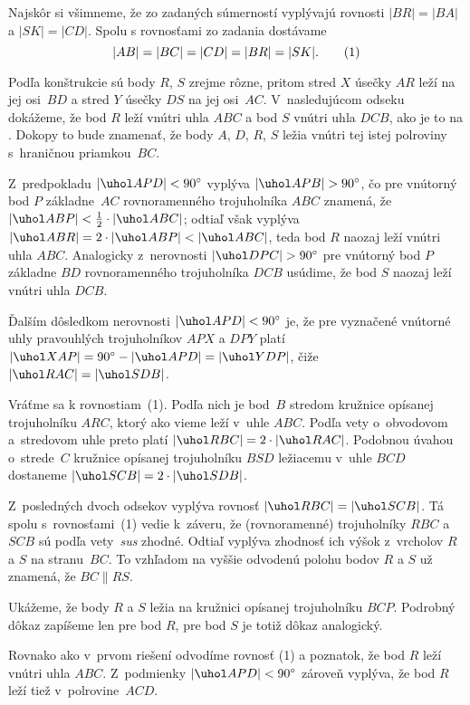 {%
Najskôr si všimneme, že zo zadaných súmerností vyplývajú
rovnosti $|BR| = |BA|$ a $|SK| = |CD|$. Spolu s rovnosťami
zo zadania dostávame
$$
|AB|=|BC|=|CD|=|BR|=|SK|.
\tag1
$$

Podľa konštrukcie sú body $R$, $S$ zrejme rôzne, pritom stred $X$
úsečky $AR$ leží na jej osi~$BD$ a stred $Y$ úsečky $DS$ na jej
osi~$AC$. V~nasledujúcom odseku dokážeme, že bod $R$ leží vnútri
uhla $ABC$ a bod $S$ vnútri uhla $DCB$, ako je to na \obr{}.
Dokopy to bude znamenať, že body $A$, $D$, $R$, $S$ ležia
vnútri tej istej polroviny s~hraničnou priamkou~$BC$.
%

Z~predpokladu $|\uhol APD|<90^{\circ}$ vyplýva $|\uhol APB|>90^{\circ}$,
čo pre vnútorný bod $P$ základne~$AC$ rovnoramenného trojuholníka $ABC$
znamená, že $|\uhol ABP|<\frac12\cdot|\uhol ABC|$; odtiaľ však vyplýva
$|\uhol ABR|=2\cdot|\uhol ABP|<|\uhol ABC|$, teda bod $R$
naozaj leží vnútri uhla $ABC$. Analogicky z~nerovnosti
$|\uhol DPC|>90^{\circ}$ pre vnútorný bod $P$ základne $BD$
rovnoramenného trojuholníka $DCB$ usúdime, že bod $S$ naozaj leží
vnútri uhla $DCB$.

Ďalším dôsledkom nerovnosti $|\uhol APD|<90^{\circ}$ je, že pre
vyznačené vnútorné uhly pravouhlých trojuholníkov $APX$ a $DPY$ platí
$|\uhol XAP|=90^{\circ}-|\uhol APD|=|\uhol YDP|$, čiže
$|\uhol RAC|=|\uhol SDB|$.

Vráťme sa k rovnostiam~(1). Podľa nich je bod~$B$ stredom
kružnice opísanej trojuholníku $ARC$, ktorý ako vieme leží v~uhle $ABC$.
Podľa vety o~obvodovom a~stredovom uhle preto platí
$|\uhol RBC|=2\cdot|\uhol RAC|$. Podobnou úvahou o~strede~$C$
kružnice opísanej trojuholníku $BSD$ ležiacemu v~uhle $BCD$ dostaneme
$|\uhol SCB|=2\cdot|\uhol SDB|$.

Z~posledných dvoch odsekov vyplýva rovnosť $|\uhol RBC|=|\uhol SCB|$.
Tá spolu s~rovnosťami~(1) vedie k~záveru, že (rovnoramenné) trojuholníky
$RBC$ a $SCB$ sú podľa vety~\emph{sus} zhodné. Odtiaľ vyplýva zhodnosť
ich výšok z~vrcholov $R$ a $S$ na stranu~$BC$.
To vzhľadom na vyššie odvodenú polohu bodov $R$ a $S$ už znamená,
že $BC\parallel RS$.

\ineriesenie
Ukážeme, že
body $R$ a $S$ ležia na kružnici opísanej trojuholníku $BCP$.
Podrobný dôkaz zapíšeme len pre bod $R$, pre bod $S$
je totiž dôkaz analogický.

Rovnako ako v~prvom riešení odvodíme rovnosť (1) a poznatok, že
bod $R$ leží vnútri uhla $ABC$. Z~podmienky $|\uhol APD|<90^{\circ}$
zároveň vyplýva, že bod $R$ leží tiež v~polrovine~$ACD$.

}
